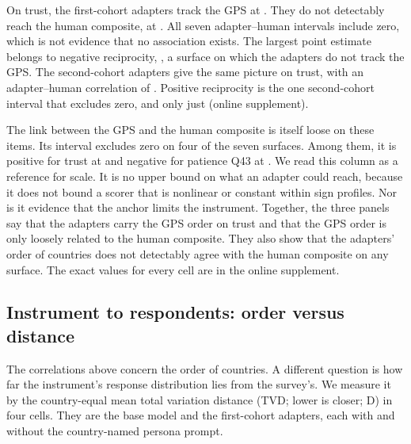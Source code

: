 On trust, the first-cohort adapters track the GPS at  . They do not detectably reach the human composite, at  . All seven adapter--human intervals include zero, which is not evidence that no association exists. The largest point estimate belongs to negative reciprocity,  , a surface on which the adapters do not track the GPS. The second-cohort adapters give the same picture on trust, with an adapter--human correlation of  . Positive reciprocity is the one second-cohort interval that excludes zero, and only just (online supplement).

The link between the GPS and the human composite is itself loose on these items. Its interval excludes zero on four of the seven surfaces. Among them, it is positive for trust at   and negative for patience Q43 at  . We read this column as a reference for scale. It is no upper bound on what an adapter could reach, because it does not bound a scorer that is nonlinear or constant within sign profiles. Nor is it evidence that the anchor limits the instrument. Together, the three panels say that the adapters carry the GPS order on trust and that the GPS order is only loosely related to the human composite. They also show that the adapters' order of countries does not detectably agree with the human composite on any surface. The exact values for every cell are in the online supplement.

\subsection{Instrument to respondents: order versus distance}\label{sec:res-tvd}

The correlations above concern the order of countries. A different question is how far the instrument's response distribution lies from the survey's. We measure it by the country-equal mean total variation distance (TVD; lower is closer; D) in four cells. They are the base model and the first-cohort adapters, each with and without the country-named persona prompt.

